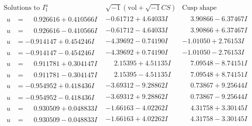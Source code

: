\documentclass[1p]{elsarticle_modified}
\theoremstyle{definition}
\newcommand{\I}{\sqrt{-1}}
\begin{document}
$$\begin{array}{c|c|c}  
\text{Solutions to }I^u_{1}& \I (\text{vol} + \sqrt{-1}CS) & \text{Cusp shape}\\
 \hline 
\begin{aligned}
u &= \phantom{-}0.926616 + 0.410566 I\end{aligned}
 & -0.61712 + 4.64033 I & \phantom{-}3.90866 - 6.37467 I \\ \hline\begin{aligned}
u &= \phantom{-}0.926616 - 0.410566 I\end{aligned}
 & -0.61712 - 4.64033 I & \phantom{-}3.90866 + 6.37467 I \\ \hline\begin{aligned}
u &= -0.914147 + 0.454246 I\end{aligned}
 & -4.39692 - 0.74190 I & -1.01050 + 2.76153 I \\ \hline\begin{aligned}
u &= -0.914147 - 0.454246 I\end{aligned}
 & -4.39692 + 0.74190 I & -1.01050 - 2.76153 I \\ \hline\begin{aligned}
u &= \phantom{-}0.911781 + 0.304147 I\end{aligned}
 & \phantom{-}2.15395 + 4.51135 I & \phantom{-}7.09548 - 8.74151 I \\ \hline\begin{aligned}
u &= \phantom{-}0.911781 - 0.304147 I\end{aligned}
 & \phantom{-}2.15395 - 4.51135 I & \phantom{-}7.09548 + 8.74151 I \\ \hline\begin{aligned}
u &= -0.954952 + 0.418436 I\end{aligned}
 & -3.69312 - 9.28862 I & \phantom{-}0.73867 + 9.25644 I \\ \hline\begin{aligned}
u &= -0.954952 - 0.418436 I\end{aligned}
 & -3.69312 + 9.28862 I & \phantom{-}0.73867 - 9.25644 I \\ \hline\begin{aligned}
u &= \phantom{-}0.930509 + 0.048833 I\end{aligned}
 & -1.66163 - 4.02262 I & \phantom{-}4.31758 + 3.30145 I \\ \hline\begin{aligned}
u &= \phantom{-}0.930509 - 0.048833 I\end{aligned}
 & -1.66163 + 4.02262 I & \phantom{-}4.31758 - 3.30145 I \\ \hline\begin{aligned}

\end{aligned}
\end{array}$$
\end{document}
